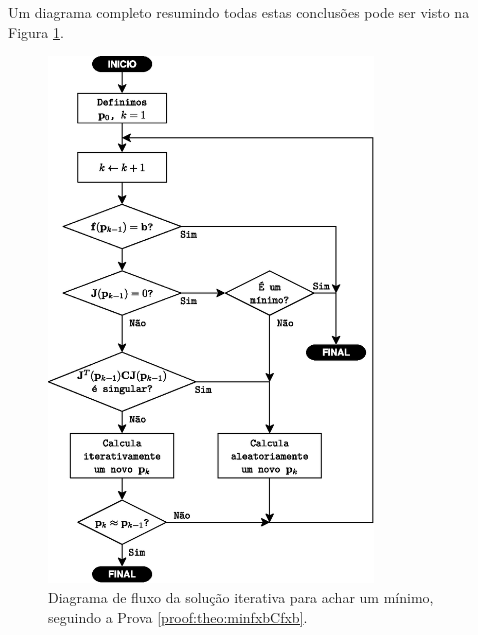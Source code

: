 \begin{myproofT}
Um diagrama completo resumindo todas estas conclusões pode ser visto na Figura \ref{fig:fluxo1}.

\begin{figure}[!h]
     \centering
         \includegraphics[width=0.77\textwidth]{chapters/minimization-fx/fluxo1.eps}
        \caption{Diagrama de fluxo da solução iterativa para achar um mínimo, seguindo a Prova \ref{proof:theo:minfxbCfxb}.}
        \label{fig:fluxo1}
\end{figure}

\end{myproofT}



